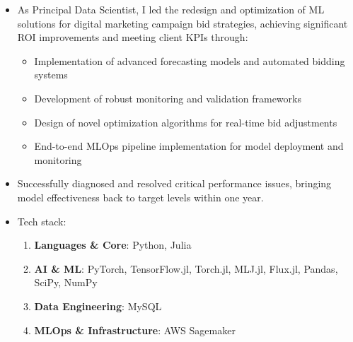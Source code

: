 {
\begin{itemize}
\item As Principal Data Scientist, I led the redesign and optimization of ML solutions for digital marketing campaign bid strategies, achieving significant ROI improvements and meeting client KPIs through:
\begin{itemize}
    \item Implementation of advanced forecasting models and automated bidding systems
    \item Development of robust monitoring and validation frameworks
    \item Design of novel optimization algorithms for real-time bid adjustments
    \item End-to-end MLOps pipeline implementation for model deployment and monitoring
\end{itemize}
\item Successfully diagnosed and resolved critical performance issues, bringing model effectiveness back to target levels within one year.
\item Tech stack:
\begin{enumerate}
    \item \textbf{Languages \& Core}: {\color{accent2}Python, Julia}
    \item \textbf{AI \& ML}: {\color{accent2}PyTorch, TensorFlow.jl, Torch.jl, MLJ.jl, Flux.jl, Pandas, SciPy, NumPy}
    \item \textbf{Data Engineering}: {\color{accent2}MySQL}
    \item \textbf{MLOps \& Infrastructure}: {\color{accent2}AWS Sagemaker}
\end{enumerate}
\end{itemize}

\divider

}
